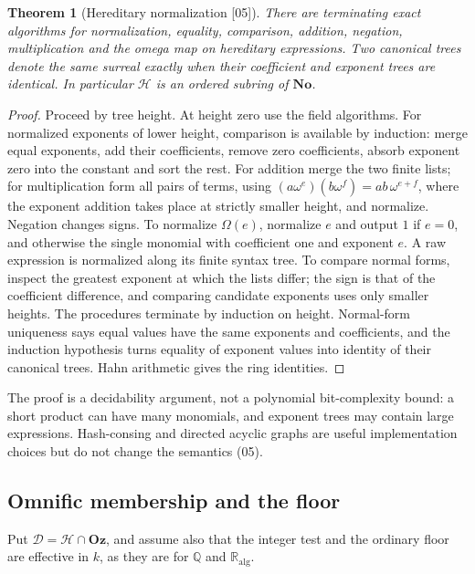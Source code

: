 \documentclass[11pt,oneside]{article}
\numberwithin{equation}{section}
\newtheorem{theorem}{Theorem}[section]
\theoremstyle{definition}
\theoremstyle{remark}
\newcommand{\No}{\mathbf{No}}
\newcommand{\Oz}{\mathbf{Oz}}
\newcommand{\Q}{\mathbb Q}
\newcommand{\R}{\mathbb R}
\newcommand{\Ralg}{\R_{\mathrm{alg}}}
\newcommand{\Hh}{\mathcal H}
\newcommand{\Dd}{\mathcal D}
\newcommand{\Om}{\Omega}
\newcommand{\src}[1]{\textup{\textsf{\small[#1]}}}
\begin{document}
\begin{theorem}[Hereditary normalization \src{05}]\label{onot:sh:thm:hereditary}
There are terminating exact algorithms for normalization, equality, comparison,
addition, negation, multiplication and the omega map on hereditary expressions.
Two canonical trees denote the same surreal exactly when their coefficient and
exponent trees are identical. In particular $\Hh$ is an ordered subring of
$\No$.
\end{theorem}
\begin{proof}
Proceed by tree height. At height zero use the field algorithms. For normalized
exponents of lower height, comparison is available by induction: merge equal
exponents, add their coefficients, remove zero coefficients, absorb exponent zero
into the constant and sort the rest. For addition merge the two finite lists;
for multiplication form all pairs of terms, using
$(a\omega^e)(b\omega^f)=ab\,\omega^{e+f}$, where the exponent addition takes place
at strictly smaller height, and normalize. Negation changes signs. To normalize
$\Om(e)$, normalize $e$ and output $1$ if $e=0$, and otherwise the single monomial
with coefficient one and exponent $e$. A raw expression is normalized along its
finite syntax tree. To compare normal forms, inspect the greatest exponent at
which the lists differ; the sign is that of the coefficient difference, and
comparing candidate exponents uses only smaller heights. The procedures terminate
by induction on height. Normal-form uniqueness says equal values have the same
exponents and coefficients, and the induction hypothesis turns equality of
exponent values into identity of their canonical trees. Hahn arithmetic gives the
ring identities.
\end{proof}

The proof is a decidability argument, not a polynomial bit-complexity bound: a
short product can have many monomials, and exponent trees may contain large
expressions. Hash-consing and directed acyclic graphs are useful implementation
choices but do not change the semantics (05).

\subsection{Omnific membership and the floor}

Put $\Dd=\Hh\cap\Oz$, and assume also that the integer test and the ordinary
floor are effective in $k$, as they are for $\Q$ and $\Ralg$.
\end{document}
